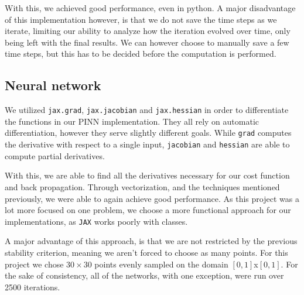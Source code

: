 \documentclass{article}
\theoremstyle{definition}
\begin{document}

With this, we achieved good performance, even in python. A major disadvantage of this implementation however, is that we do not save the time steps as we iterate, limiting our ability to analyze how the iteration evolved over time, only being left with the final results. We can however choose to manually save a few time steps, but this has to be decided before the computation is performed.

\subsection{Neural network}
We utilized \verb|jax.grad|, \verb|jax.jacobian| and \verb|jax.hessian| in order to differentiate the functions in our PINN implementation. They all rely on automatic differentiation, however they serve slightly different goals. While \verb|grad| computes the derivative with respect to a single input, \verb|jacobian| and \verb|hessian| are able to compute partial derivatives.

With this, we are able to find all the derivatives necessary for our cost function and back propagation. Through vectorization, and the techniques mentioned previously, we were able to again achieve good performance. As this project was a lot more focused on one problem, we choose a more functional approach for our implementations, as \verb|JAX| works poorly with classes.

A major advantage of this approach, is that we are not restricted by the previous stability criterion, meaning we aren't forced to choose as many points. For this project we chose $30 \times 30$ points evenly sampled on the domain $[0,1]$x$[0, 1]$. For the sake of consistency, all of the networks, with one exception, were run over 2500 iterations.

\newpage
\end{document}
